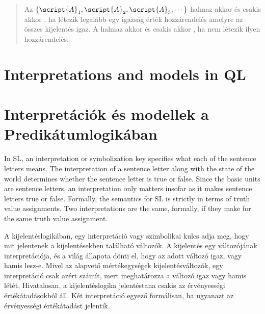 \begin{quote}
\label{def.consistencySL}
Az $\{\script{A}_1,\script{A}_2,\script{A}_3,\cdots\}$ halmaz akkor és csakis akkor  , ha létezik legalább egy igazság érték hozzárendelés amelyre az összes kijelentés igaz. A halmaz akkor és csakis akkor  , ha nem létezik ilyen hozzárendelés.
\end{quote}

\section*{Interpretations and models in QL}
\section{Interpretációk és modellek a Predikátumlogikában}

In SL, an interpretation or symbolization key specifies what each of the sentence letters means. The interpretation of a sentence letter along with the state of the world determines whether the sentence letter is true or false.
Since the basic units are sentence letters, an interpretation only matters insofar as it makes sentence letters true or false. Formally, the semantics for SL is strictly in terms of truth value assignments. Two interpretations are the same, formally, if they make for the same truth value assignment.

A kijelentéslogikában, egy interpretáció vagy szimbolikai kulcs adja meg, hogy mit jelentenek a kijelentésekben található változók. A kijelentés egy változójának interpretációja, és a világ állapota dönti el, hogy az adott változó igaz, vagy hamis lesz-e. Mivel az alapvető mértékegységek kijelentésváltozók, egy interpretáció csak azért számít, mert meghatározza a változó igaz vagy hamis létét. Hivatalosan, a kijelentéslogika jelentéstana csakis az érvényességi értékátadásokból áll. Két interpretáció egyező formálisan, ha ugyanazt az érvényességi értékátadást jelentik.

